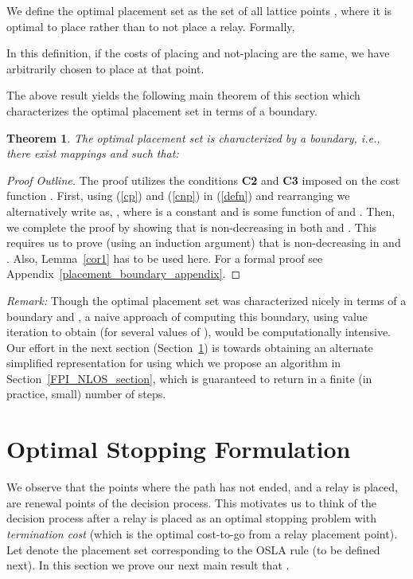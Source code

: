 \documentclass[conference]{IEEEtran}
\newtheorem{theorem}{Theorem}
\begin{document}
We define the optimal placement set  as the set of all lattice points , 
where it is optimal to place rather than to not place a relay. Formally,

In this definition, if the costs of placing and not-placing are the
same, we have arbitrarily chosen to place at that point.


The above result yields the following main theorem of this section
which characterizes the optimal placement set  in
terms of a boundary.
\begin{theorem} 
\label{placement_boundary}
The optimal placement set  is characterized by a boundary, i.e., there exist 
mappings   and   such that:

\end{theorem}
\begin{proof}[Proof Outline]
  The proof utilizes the conditions \textbf{C2} and \textbf{C3}
  imposed on the cost function . First, using (\ref{cp}) and
  (\ref{cnp}) in (\ref{defn}) and rearranging we alternatively write
   as, , where  is a constant and  is some function
  of  and . Then, we complete the proof by showing that 
  is non-decreasing in both  and . This requires us to prove
  (using an induction argument) that  is non-decreasing in  and . Also,
  Lemma~\ref{cor1} has to be used here. For a formal proof see
  Appendix~\ref{placement_boundary_appendix}.
\end{proof}


\emph{Remark:} Though the optimal placement set 
was characterized nicely in terms of a boundary  and
, a naive approach of computing this boundary, using value
iteration to obtain  (for several values of
), would be computationally intensive. Our
effort in the next section (Section~\ref{OSLA_formulation_section}) is
towards obtaining an alternate simplified representation for
 using which we propose an algorithm in
Section~\ref{FPI_NLOS_section}, which is guaranteed to return
 in a finite (in practice, small) number of
steps.

\section{Optimal Stopping Formulation} 
\label{OSLA_formulation_section}
We observe that the points where the path has not ended, and a relay is placed, 
are renewal points of the 
decision process. This motivates us to think of the decision process after a relay is placed as an 
optimal stopping problem with \emph{termination cost}  (which is the optimal cost-to-go 
from a relay placement point). Let  denote the placement set 
corresponding to the OSLA rule (to be defined next). In this section we prove our next  main result 
that .
\end{document}
